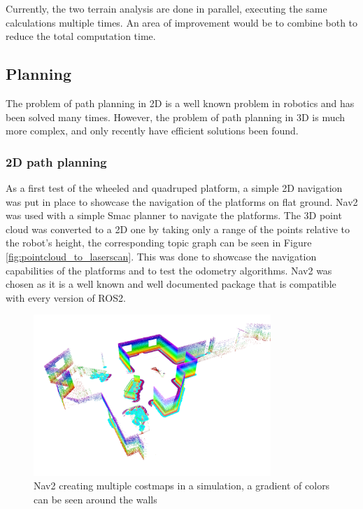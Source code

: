 \documentclass[12pt]{article}
\begin{document}
        Currently, the two terrain analysis are done in parallel, executing the same calculations multiple times. An area of improvement would be to combine both to reduce the total computation time.

    \subsection{Planning}

        The problem of path planning in 2D is a well known problem in robotics and has been solved many times. However, the problem of path planning in 3D is much more complex, and only recently have efficient solutions been found. 

        \subsubsection{2D path planning}
        As a first test of the wheeled and quadruped platform, a simple 2D navigation was put in place to showcase the navigation of the platforms on flat ground. Nav2 \cite{macenski2020marathon2} was used with a simple Smac planner \cite{macenski2024smac} to navigate the platforms. The 3D point cloud was converted to a 2D one by taking only a range of the points relative to the robot's height, the corresponding topic graph can be seen in Figure \ref{fig:pointcloud_to_laserscan}. This was done to showcase the navigation capabilities of the platforms and to test the odometry algorithms. Nav2 was chosen as it is a well known and well documented package that is compatible with every version of ROS2. 
                
        \begin{figure}[H]
            \centering
            \includegraphics[width=0.8\textwidth]{Images/nav2_costmaps_alpha.png}
            \caption{Nav2 creating multiple costmaps in a simulation, a gradient of colors can be seen around the walls}
            \label{fig:nav2_costmaps}
        \end{figure}
        
\end{document}
